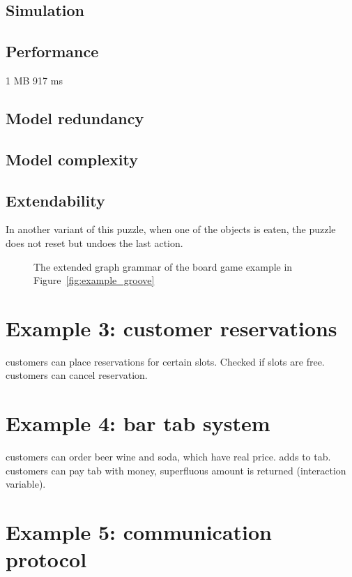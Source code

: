 \subsection{Simulation}


\subsection{Performance}
1 MB 917 ms

\subsection{Model redundancy}


\subsection{Model complexity}


\subsection{Extendability}
In another variant of this puzzle, when one of the objects is eaten, the puzzle does not reset but undoes the last action. 

\begin{figure}[ht]
  \begin{center}
    
  \end{center}
  \caption{The extended graph grammar of the board game example in Figure~\ref{fig:example_groove}}
  \label{fig:gg-fwgc-extended}
\end{figure}

\section{Example 3: customer reservations}
customers can place reservations for certain slots. Checked if slots are free. customers can cancel reservation.

\section{Example 4: bar tab system}
customers can order beer wine and soda, which have real price. adds to tab. customers can pay tab with money, superfluous amount is returned (interaction variable).

\section{Example 5: communication protocol}
